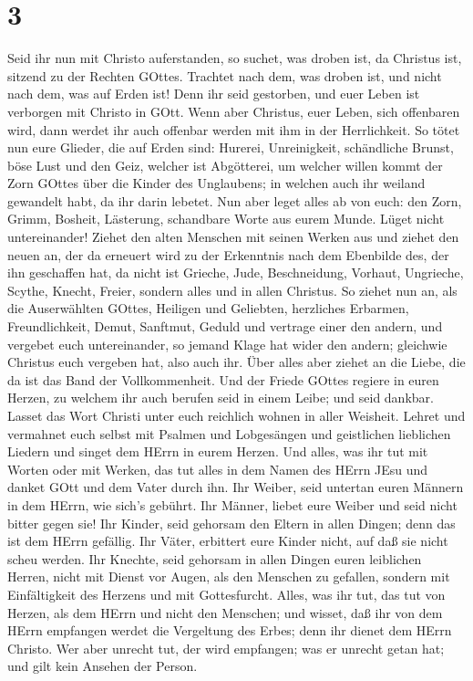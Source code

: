 \hypertarget{section-2}{%
\section{3}\label{section-2}}

 Seid ihr nun mit Christo auferstanden, so suchet, was
droben ist, da Christus ist, sitzend zu der Rechten GOttes. 
Trachtet nach dem, was droben ist, und nicht nach dem, was auf Erden
ist!  Denn ihr seid gestorben, und euer Leben ist verborgen
mit Christo in GOtt.  Wenn aber Christus, euer Leben, sich
offenbaren wird, dann werdet ihr auch offenbar werden mit ihm in der
Herrlichkeit.  So tötet nun eure Glieder, die auf Erden
sind: Hurerei, Unreinigkeit, schändliche Brunst, böse Lust und den Geiz,
welcher ist Abgötterei,  um welcher willen kommt der Zorn
GOttes über die Kinder des Unglaubens;  in welchen auch ihr
weiland gewandelt habt, da ihr darin lebetet.  Nun aber
leget alles ab von euch: den Zorn, Grimm, Bosheit, Lästerung, schandbare
Worte aus eurem Munde.  Lüget nicht untereinander! Ziehet
den alten Menschen mit seinen Werken aus  und ziehet den
neuen an, der da erneuert wird zu der Erkenntnis nach dem Ebenbilde des,
der ihn geschaffen hat,  da nicht ist Grieche, Jude,
Beschneidung, Vorhaut, Ungrieche, Scythe, Knecht, Freier, sondern alles
und in allen Christus.  So ziehet nun an, als die
Auserwählten GOttes, Heiligen und Geliebten, herzliches Erbarmen,
Freundlichkeit, Demut, Sanftmut, Geduld  und vertrage einer
den andern, und vergebet euch untereinander, so jemand Klage hat wider
den andern; gleichwie Christus euch vergeben hat, also auch ihr.
 Über alles aber ziehet an die Liebe, die da ist das Band
der Vollkommenheit.  Und der Friede GOttes regiere in euren
Herzen, zu welchem ihr auch berufen seid in einem Leibe; und seid
dankbar.  Lasset das Wort Christi unter euch reichlich
wohnen in aller Weisheit. Lehret und vermahnet euch selbst mit Psalmen
und Lobgesängen und geistlichen lieblichen Liedern und singet dem HErrn
in eurem Herzen.  Und alles, was ihr tut mit Worten oder
mit Werken, das tut alles in dem Namen des HErrn JEsu und danket GOtt
und dem Vater durch ihn.  Ihr Weiber, seid untertan euren
Männern in dem HErrn, wie sich's gebührt.  Ihr Männer,
liebet eure Weiber und seid nicht bitter gegen sie!  Ihr
Kinder, seid gehorsam den Eltern in allen Dingen; denn das ist dem HErrn
gefällig.  Ihr Väter, erbittert eure Kinder nicht, auf daß
sie nicht scheu werden.  Ihr Knechte, seid gehorsam in
allen Dingen euren leiblichen Herren, nicht mit Dienst vor Augen, als
den Menschen zu gefallen, sondern mit Einfältigkeit des Herzens und mit
Gottesfurcht.  Alles, was ihr tut, das tut von Herzen, als
dem HErrn und nicht den Menschen;  und wisset, daß ihr von
dem HErrn empfangen werdet die Vergeltung des Erbes; denn ihr dienet dem
HErrn Christo.  Wer aber unrecht tut, der wird empfangen;
was er unrecht getan hat; und gilt kein Ansehen der Person.

